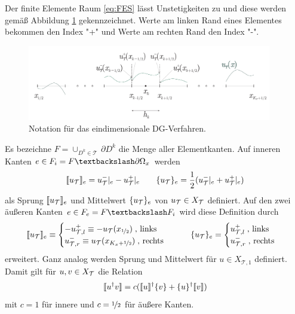 Der finite Elemente Raum \eqref{eq:FES} lässt Unstetigkeiten zu und diese werden gemäß Abbildung \ref{fig:notation_DG} gekennzeichnet. Werte am linken Rand eines Elementes bekommen den Index "+" und Werte am rechten Rand den Index "-".
\begin{figure}
  \centering
  \includegraphics[width=0.95\textwidth]{files/notationDG.pdf}
  \caption{Notation für das eindimensionale DG-Verfahren.}
  \label{fig:notation_DG}
\end{figure}
\begin{definition}\label{def:jump}
Es bezeichne $F=\cup_{D^k\in\mathcal{T}} \, \partial D^k$ die Menge aller Elementkanten. Auf inneren Kanten $e\in F_i=F  \textbackslash \partial\Omega_x$ werden
\begin{equation}
  \llbracket u_{\mathcal{T}} \rrbracket_e = u_{\mathcal{T}}^-|_e - u_{\mathcal{T}}^+|_e \qquad \{ u_{\mathcal{T}} \}_e = \frac{1}{2} (u_{\mathcal{T}}^-|_e + u_{\mathcal{T}}^+|_e)
  \label{eq:jump_def_inner}
\end{equation}
als Sprung $\llbracket u_{\mathcal{T}} \rrbracket_e$ und Mittelwert $\{ u_{\mathcal{T}} \}_e$ von $u_{\mathcal{T}} \in X_{\mathcal{T}}$ definiert. Auf den zwei äußeren Kanten $e\in F_e = F \textbackslash F_i$ wird diese Definition durch
\begin{equation}
  \llbracket u_{\mathcal{T}} \rrbracket_e \equiv
        \begin{cases}
          -u_{\mathcal{T},l}^+ \equiv -u_{\mathcal{T}}(x_{\nicefrac{1}{2}})     \; \text{, links}\\
           u_{\mathcal{T},r}^- \equiv  u_{\mathcal{T}}(x_{K_x+\nicefrac{1}{2}}) \; \text{, rechts}
        \end{cases}
   \qquad \{ u_{\mathcal{T}} \}_e = \begin{cases} u_{\mathcal{T},l}^+ \; \text{, links}\\ u_{\mathcal{T},r}^- \; \text{, rechts}\\  \end{cases}
   \label{eq:jump_def_outer}
\end{equation}
erweitert. Ganz analog werden Sprung und Mittelwert für $u \in X_{\mathcal{T},1}$ definiert. Damit gilt für  $u,v\in X_{\mathcal{T}}$ die Relation
\begin{equation}
  \llbracket u^{\dagger}v \rrbracket = c(\llbracket u \rrbracket^{\dagger}\{ v \} + \{ u \}^{\dagger}\llbracket v \rrbracket)
  \label{eq:jump_relation}
\end{equation}
mit $c=1$ für innere und $c=\nicefrac{1}{2}$ für äußere Kanten.
\end{definition}
